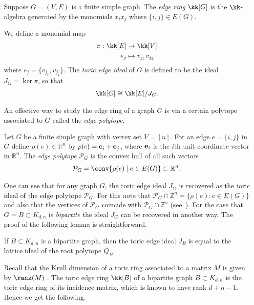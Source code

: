 \begin{definition}\label{def: toric+edge+ideal}
Suppose $G = (V,E)$ is a finite simple graph. The \emph{edge ring} $\kk[G]$ is the $\kk$-algebra generated by the monomials $x_ix_j$ where $\{i,j\} \in E(G)$.

We define a monomial map
\begin{align*}
    \pi:\kk[E] &\rightarrow \kk[V] \\
    e_j &\mapsto v_{j_1}v_{j_2}
\end{align*}
where $e_j = \{v_{j_1}, v_{j_2}\}$.  The \emph{toric edge ideal} of $G$ is defined to be the ideal $J_G = \ker \pi$, so that 
\[\kk[G] \cong \kk[E]/J_G.\]
\end{definition}

An effective way to study the edge ring of a graph $G$ is via a certain polytope associated to $G$ called the \textit{edge polytope}. 

\begin{definition}\label{def: edgePolytope}
Let $G$ be a finite simple graph with vertex set $V = [n]$. For an edge $e =\{i,j\}$ in $G$ define $\rho(e) \in {\mathbb R}^n$ by $\rho(e) = {\bf e}_i + {\bf e}_j$, where ${\bf e}_i$ is the $i$th unit coordinate vector in ${\mathbb R}^n$. The \emph{edge polytope} ${\mathcal P}_G$ is the convex hull of all such vectors
\[{\mathcal P}_G = \conv\{\rho(e) \mid e \in E(G)\} \subset {\mathbb R}^n.\]
\end{definition}

One can see that for any graph $G$, the toric edge ideal $J_G$ is recovered as the toric ideal of the edge polytope ${\mathcal P}_G$. For this note that ${\mathcal P}_G \cap {\mathbb Z}^n = \{\rho(e): e \in E(G)\}$ and also that the vertices of ${\mathcal P}_G$ coincide with ${\mathcal P}_G \cap {\mathbb Z}^n$ (see~\cite[Lemma 5.2]{HHOBinomial}).  For the case that $G = B \subset K_{d,n}$ is \emph{bipartite} the ideal $J_G$ can be recovered in another way. The proof of the following lemma is straightforward.

\begin{lemma}\label{lem: bipartite}
If $B \subset K_{d,n}$ is a bipartite graph, then the toric edge ideal $J_B$ is equal to the lattice ideal of the root polytope $Q_B$.  
\end{lemma}

Recall that the Krull dimension of a toric ring associated to a matrix $M$ is given by $\rank(M)$ 
\cite[Proposition 3.1]{HHOBinomial}.  The toric edge ring $\kk[B]$ of a bipartite graph $B \subset K_{d,n}$ is the toric edge ring of its incidence matrix, which is known to have rank $d + n -1$.  Hence we get the following.

